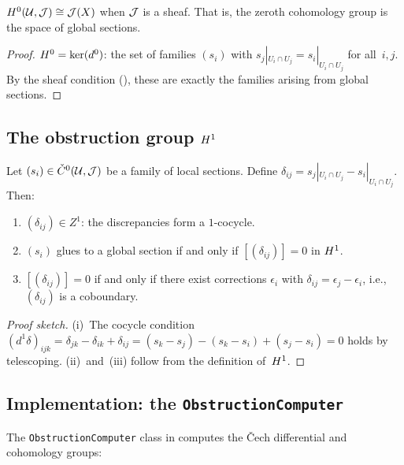 \documentclass[11pt]{article}
\begin{document}
\begin{proposition}\label{prop:h0-global}
$H^{0}(\mathcal{U}, \mathcal{J}) \cong \mathcal{J}(X)$ when $\mathcal{J}$ is a sheaf.  That is,
the zeroth cohomology group is the space of global sections.
\end{proposition}

\begin{proof}
$H^{0} = \ker(d^0)$: the set of families $(s_i)$ with
$s_j|_{U_i \cap U_j} = s_i|_{U_i \cap U_j}$ for all~$i,j$.  By the sheaf
condition (), these are exactly the families arising from
global sections.
\end{proof}

\subsection{The obstruction group $H^{1}$}

\begin{theorem}\label{thm:h1-obstruction}
Let $(s_i) \in \check{C}^0(\mathcal{U}, \mathcal{J})$ be a family of local sections.
Define $\delta_{ij} = s_j|_{U_i \cap U_j} - s_i|_{U_i \cap U_j}$.  Then:
\begin{enumerate}[label=(\roman*)]
\item $(\delta_{ij}) \in Z^1$: the discrepancies form a $1$-cocycle.
\item $(s_i)$ glues to a global section if and only if
  $[(\delta_{ij})] = 0$ in $H^{1}$.
\item $[(\delta_{ij})] = 0$ if and only if there exist corrections
  $\epsilon_i$ with $\delta_{ij} = \epsilon_j - \epsilon_i$, i.e.,
  $(\delta_{ij})$ is a coboundary.
\end{enumerate}
\end{theorem}

\begin{proof}[Proof sketch]
(i)~The cocycle condition $(d^1 \delta)_{ijk} = \delta_{jk} - \delta_{ik} +
\delta_{ij} = (s_k - s_j) - (s_k - s_i) + (s_j - s_i) = 0$ holds by
telescoping.  (ii)~and~(iii) follow from the definition of~$H^{1}$.
\end{proof}

\subsection{Implementation: the \texttt{ObstructionComputer}}

The \texttt{ObstructionComputer} class in \JuGeo{} computes the \v{C}ech
differential and cohomology groups:
\end{document}
